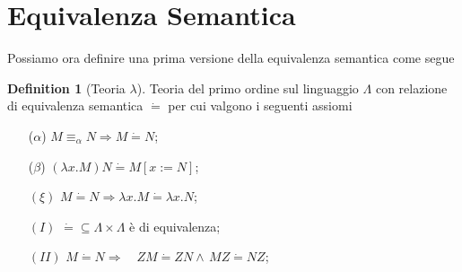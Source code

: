 \documentclass[a4paper,11pt]{article}
\theoremstyle{definition}
\newtheorem{defn}{Definition}
\begin{document}
\section{Equivalenza Semantica}
Possiamo ora definire una prima versione della equivalenza semantica come segue
\begin{defn}[Teoria $\lambda$]
  Teoria del primo ordine sul linguaggio $\Lambda$ con relazione di equivalenza semantica 
  $\dot =$ per cui valgono i seguenti assiomi
  \begin{itemize}
    \item[($\alpha$)] $M\equiv_\alpha N \Rightarrow M \dot = N$;
    \item[($\beta$)] $(\lambda x.M)N \dot = M[x:=N]$;
    \item[$(\xi)$] $M\dot = N \Rightarrow \lambda x.M \dot = \lambda x.N$;
    \item[$(I)$] $\dot = \subseteq \Lambda\times\Lambda$ è di equivalenza;
    \item[$(II)$] $M\dot = N \Rightarrow \quad ZM\dot =ZN \wedge\, MZ\dot
      =NZ$;
  \end{itemize}
\end{defn}
\end{document}
